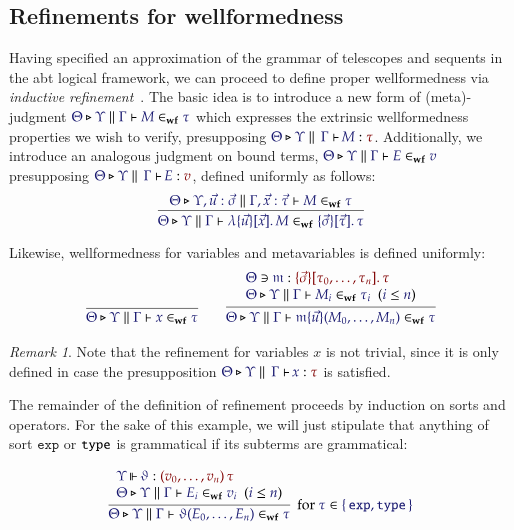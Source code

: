 \documentclass[11pt]{article}
\theoremstyle{definition}
\theoremstyle{remark}
\newtheorem{remark}[thm]{Remark}
\numberwithin{equation}{section}
\def\IModeColorName{MidnightBlue}
\def\OModeColorName{Maroon}
\newcommand\IMode[1]{{\color{\IModeColorName}{#1}}}
\newcommand\OMode[1]{{\color{\OModeColorName}{#1}}}
\newcommand\HypJ[2]{#1\ \ (#2)}
\newcommand\MkSet[1]{\left\{\,#1\,\right\}}
\newcommand\Member[2]{\IMode{#1}\in\IMode{#2}}
\newcommand\MkValence[3]{%
  \ifthenelse{\equal{#1}{}}{}{%
    \{#1\}%
  }%
  \ifthenelse{\equal{#2}{}}{}{%
    [#2]%
  }.\, #3%
}
\newcommand\MkBTm[3]{\mathbb{\lambda}\{#1\}[#2].\, #3}
\newcommand\MkArity[2]{(#1)\, #2}
\newcommand\Leq[2]{\IMode{#1}\leq\IMode{#2}}
\newcommand\IsOperator[3]{
  \IMode{#1}\,{\Vdash}\,\IMode{#2}: \OMode{#3}
}
\newcommand\Lookup[3]{\IMode{#1}\ni\IMode{#2}:\OMode{#3}}
\newcommand\IsAbt[5]{%
  \IMode{#1}\triangleright%
  \IMode{#2}\parallel%
  \,{\IMode{#3}\vdash}\,%
  \IMode{#4}:\OMode{#5}%
}
\newcommand\IsWf[5]{%
  \IMode{#1}\triangleright%
  \IMode{#2}\parallel%
  \IMode{#3}\vdash%
  \IMode{#4}\in_{\mathbf{wf}}\IMode{#5}%
}
\newcommand\MV[1]{\mathfrak{#1}}
\newcommand\MApp[3]{#1\{#2\}(#3)}
\newcommand\App[2]{#1(#2)}
\newcommand\SortExp{\mathtt{exp}}
\begin{document}
\subsection{Refinements for wellformedness}

Having specified an approximation of the grammar of telescopes and sequents in
the abt logical framework, we can proceed to define proper wellformedness via
\emph{inductive refinement}~\cite{harper:2016}. The basic idea is to introduce a
new form of (meta)-judgment $\IsWf{\Theta}{\Upsilon}{\Gamma}{M}{\tau}$ which
expresses the extrinsic wellformedness properties we wish to verify,
presupposing $\IsAbt{\Theta}{\Upsilon}{\Gamma}{M}{\tau}$. Additionally, we
introduce an analogous judgment on bound terms,
$\IsWf{\Theta}{\Upsilon}{\Gamma}{E}{v}$ presupposing
$\IsAbt{\Theta}{\Upsilon}{\Gamma}{E}{v}$, defined uniformly as follows:
\[
  \infer{
    \IsWf{\Theta}{\Upsilon}{\Gamma}{
      \MkBTm{\vec{u}}{\vec{x}}{M}
    }{
      \MkValence{\vec{\sigma}}{\vec{\tau}}{\tau}
    }
  }{
    \IsWf{\Theta}{\Upsilon,\vec{u}:\vec{\sigma}}{\Gamma,\vec{x}:\vec{\tau}}{M}{\tau}
  }
\]

Likewise, wellformedness for variables and metavariables is defined uniformly:
\begin{gather*}
  \infer{
    \IsWf{\Theta}{\Upsilon}{\Gamma}{x}{\tau}
  }{
  }
\qquad
  \infer{
    \IsWf{\Theta}{\Upsilon}{\Gamma}{
      \MApp{\MV{m}}{\vec{u}}{M_0,\dots,M_n}
    }{\tau}
  }{
    \begin{array}{l}
      \Lookup{\Theta}{\MV{m}}{\MkValence{\vec{\sigma}}{\tau_0,\dots,\tau_n}{\tau}}
\\
      \HypJ{
        \IsWf{\Theta}{\Upsilon}{\Gamma}{M_i}{\tau_i}
      }{
        \Leq{i}{n}
      }
    \end{array}
  }
\end{gather*}

\begin{remark}
  Note that the refinement for variables $x$ is not trivial, since it is only
  defined in case the presupposition $\IsAbt{\Theta}{\Upsilon}{\Gamma}{x}{\tau}$
  is satisfied.
\end{remark}

The remainder of the definition of refinement proceeds by induction on sorts and
operators. For the sake of this example, we will just stipulate that anything of
sort $\SortExp$ or $\mathtt{type}$ is grammatical if its subterms are grammatical:

\[
  \infer[
    \text{for $\Member{\tau}{\MkSet{\SortExp,\SortType}}$}
  ]{
    \IsWf{\Theta}{\Upsilon}{\Gamma}{
      \App{\vartheta}{E_0,\dots,E_n}
    }{\tau}
  }{
    \begin{array}{l}
      \IsOperator{\Upsilon}{\vartheta}{
        \MkArity{
          v_0,\dots,v_n
        }{\tau}
      }
\\
      \HypJ{
        \IsWf{\Theta}{\Upsilon}{\Gamma}{E_i}{v_i}
      }{
        \Leq{i}{n}
      }
    \end{array}
  }
\]
\end{document}

